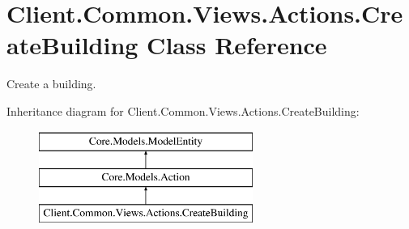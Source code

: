 \hypertarget{classClient_1_1Common_1_1Views_1_1Actions_1_1CreateBuilding}{}\section{Client.\+Common.\+Views.\+Actions.\+Create\+Building Class Reference}
\label{classClient_1_1Common_1_1Views_1_1Actions_1_1CreateBuilding}


Create a building.  


Inheritance diagram for Client.\+Common.\+Views.\+Actions.\+Create\+Building\+:\begin{figure}[H]
\begin{center}
\leavevmode
\includegraphics[height=3.000000cm]{classClient_1_1Common_1_1Views_1_1Actions_1_1CreateBuilding}
\end{center}
\end{figure}
